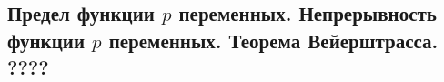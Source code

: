 {
\subsection{Предел функции \(p\) переменных. Непрерывность функции \(p\) переменных. Теорема Вейерштрасса. ????}
}